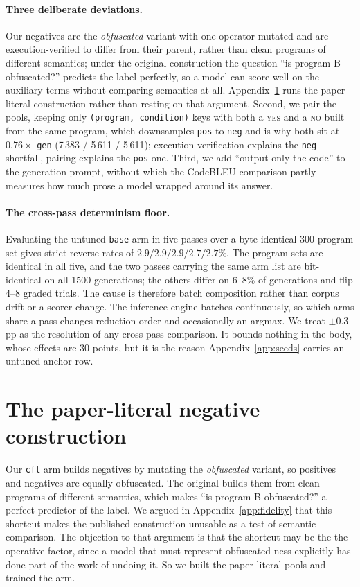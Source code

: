 \documentclass{article}
\newcommand{\arm}[1]{\texttt{#1}}
\begin{document}
\paragraph{Three deliberate deviations.} Our negatives are the \emph{obfuscated} variant
with one operator mutated and are execution-verified to differ from their parent, rather
than clean programs of different semantics; under the original construction the question
``is program B obfuscated?'' predicts the label perfectly, so a model can score well on the
auxiliary terms without comparing semantics at all. Appendix~\ref{app:cleanneg} runs the
paper-literal construction rather than resting on that argument. Second, we pair the pools,
keeping only \texttt{(program, condition)} keys with both a \textsc{yes} and a \textsc{no}
built from the same program, which downsamples \arm{pos} to \arm{neg} and is why both sit at
$0.76\times$ \arm{gen} (7\,383 / 5\,611 / 5\,611); execution verification explains the
\arm{neg} shortfall, pairing explains the \arm{pos} one. Third, we add ``output only the
code'' to the generation prompt, without which the CodeBLEU comparison partly measures how
much prose a model wrapped around its answer.

\paragraph{The cross-pass determinism floor.} Evaluating the untuned \arm{base} arm in five
passes over a byte-identical 300-program set gives strict reverse rates of $2.9/2.9/2.9/
2.7/2.7\%$. The program sets are identical in all five, and the two passes carrying the same
arm list are bit-identical on all 1500 generations; the others differ on 6--8\% of
generations and flip 4--8 graded trials. The cause is therefore batch composition rather
than corpus drift or a scorer change. The inference engine batches continuously, so which
arms share a pass changes reduction order and occasionally an argmax. We treat $\pm0.3$ pp as
the resolution of any cross-pass comparison. It bounds nothing in the body, whose effects
are 30 points, but it is the reason Appendix~\ref{app:seeds} carries an untuned anchor row.

\section{The paper-literal negative construction}
\label{app:cleanneg}

Our \arm{cft} arm builds negatives by mutating the \emph{obfuscated} variant, so positives and
negatives are equally obfuscated. The original builds them from clean programs of different
semantics, which makes ``is program B obfuscated?'' a perfect predictor of the label. We argued
in Appendix~\ref{app:fidelity} that this shortcut makes the published construction unusable as a
test of semantic comparison. The objection to that argument is that the shortcut may be the
the operative factor, since a model that must represent obfuscated-ness explicitly has done part of
the work of undoing it. So we built the paper-literal pools and trained the arm.
\end{document}
